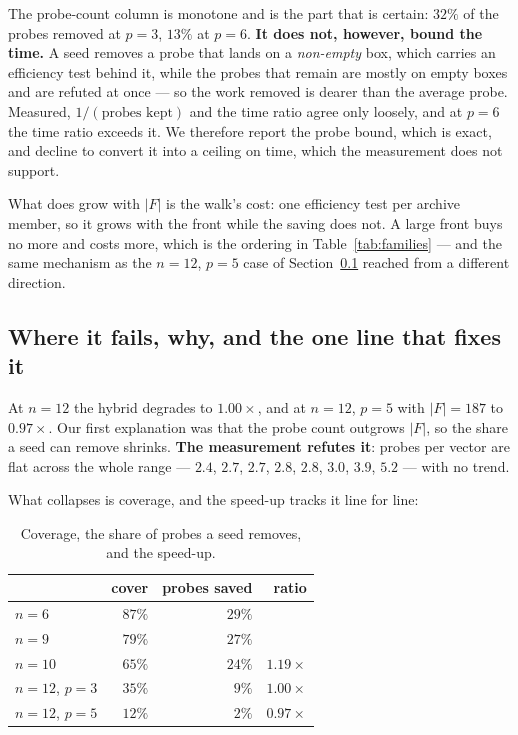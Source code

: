 \documentclass[11pt,a4paper]{article}
\begin{document}
\noindent
The probe-count column is monotone and is the part that is certain: $32\%$ of
the probes removed at $p=3$, $13\%$ at $p=6$.  \textbf{It does not, however,
bound the time.}  A seed removes a probe that lands on a \emph{non-empty} box,
which carries an efficiency test behind it, while the probes that remain are
mostly on empty boxes and are refuted at once --- so the work removed is dearer
than the average probe.  Measured, $1/(\text{probes kept})$ and the time ratio
agree only loosely, and at $p = 6$ the time ratio exceeds it.  We therefore
report the probe bound, which is exact, and decline to convert it into a
ceiling on time, which the measurement does not support.

What does grow with $|F|$ is the walk's cost: one efficiency test per archive
member, so it grows with the front while the saving does not.  A large front
buys no more and costs more, which is the ordering in
Table~\ref{tab:families} --- and the same mechanism as the $n = 12$, $p = 5$
case of Section~\ref{sec:collapse} reached from a different direction.

\subsection{Where it fails, why, and the one line that fixes it}
\label{sec:collapse}

At $n = 12$ the hybrid degrades to $1.00\times$, and at $n = 12$, $p = 5$ with
$|F| = 187$ to $0.97\times$.  Our first explanation was that the probe count
outgrows $|F|$, so the share a seed can remove shrinks.  \textbf{The
measurement refutes it}: probes per vector are flat across the whole range ---
$2.4$, $2.7$, $2.7$, $2.8$, $2.8$, $3.0$, $3.9$, $5.2$ --- with no trend.

What collapses is coverage, and the speed-up tracks it line for line:

\begin{table}[h]
\centering
\caption{Coverage, the share of probes a seed removes, and the speed-up.}
\label{tab:collapse}
\begin{tabular}{lrrr}
\toprule
 & cover & probes saved & ratio \\
\midrule
$n=6$  & $87\%$ & $29\%$ & \\
$n=9$  & $79\%$ & $27\%$ & \\
$n=10$ & $65\%$ & $24\%$ & $1.19\times$ \\
$n=12$, $p=3$ & $35\%$ & $9\%$ & $1.00\times$ \\
$n=12$, $p=5$ & $12\%$ & $2\%$ & $0.97\times$ \\
\bottomrule
\end{tabular}
\end{table}
\end{document}
